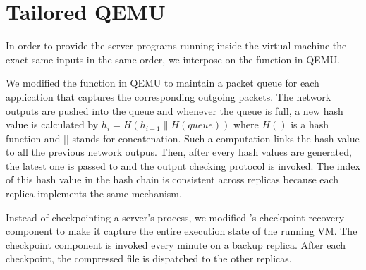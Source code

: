 \section{Tailored QEMU} \label{sec:qemu}

In order to provide the server programs running inside the virtual machine the exact same 
inputs in the same order, we interpose on the \tapsend function in QEMU.

We modified the \taprecv function in QEMU to maintain a packet queue for each application 
that captures the corresponding outgoing packets. The network outputs are pushed into the 
queue and whenever the queue is full, a new hash value is calculated by 
$h_i=H(h_{i-1}\|H(queue))$ where $H()$ is a hash function and $||$ stands for concatenation. 
Such a computation links the hash value to all the previous network outpus. Then, after every 
\thashcomp hash values are generated, the latest one is passed to \smrsystem and the output 
checking protocol is invoked. The index of this hash value in the hash chain is 
consistent across replicas because each replica implements the same mechanism. 


Instead of checkpointing a server's process, we modified \smrsystem's checkpoint-recovery 
component to make it capture the entire execution state of the running VM. The checkpoint 
component is invoked every minute on a backup replica. After each checkpoint, the compressed 
file is dispatched to the other replicas. 
